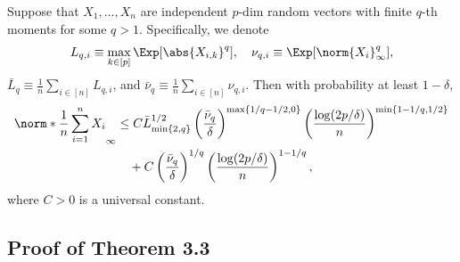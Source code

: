 \documentclass[aos]{imsart}
\begin{document}
\begin{appendix}


\begin{lemma} \label{thm:conc_ineq_q}
    Suppose that $X_1, \dots, X_n$ are independent $p$-dim random vectors with finite $q$-th moments for some $q > 1$. Specifically, we denote
    \begin{equation*}
        L_{q,i} \equiv \max_{k \in [p]} \Exp[\abs{X_{i,k}}^q],
        \quad
        \nu_{q,i} \equiv \Exp[\norm{X_{i}}_\infty^q],
    \end{equation*}
    $\bar{L}_{q} \equiv \frac{1}{n} \sum_{i \in [n]} L_{q,i}$,
    and $\bar\nu_{q} \equiv \frac{1}{n} \sum_{i \in [n]} \nu_{q,i}$. Then with probability at least $1 - \delta$,
    \begin{equation*}
    \begin{aligned}
        \norm*{\frac{1}{n}\sum_{i=1}^n X_i}_\infty
        & \leq C \bar{L}_{\min\{2, q\}}^{1/2} \left(\frac{\bar{\nu}_q}{\delta} \right)^{\max\{1/q-1/2,0\}}
        \left(\frac{\log(2p/\delta)}{n}\right)^{\min\{1-1/q, 1/2\}} \\
        & \quad + C \left(\frac{\bar{\nu}_q}{\delta} \right)^{1/q} \left(\frac{\log(2p/\delta)}{n}\right)^{1-1/q},
    \end{aligned}
    \end{equation*}
    where $C > 0$ is a universal constant.
\end{lemma}




\subsection{Proof of Theorem 3.3} \label{sec:pf_psg_error}


\end{appendix}
\end{document}
